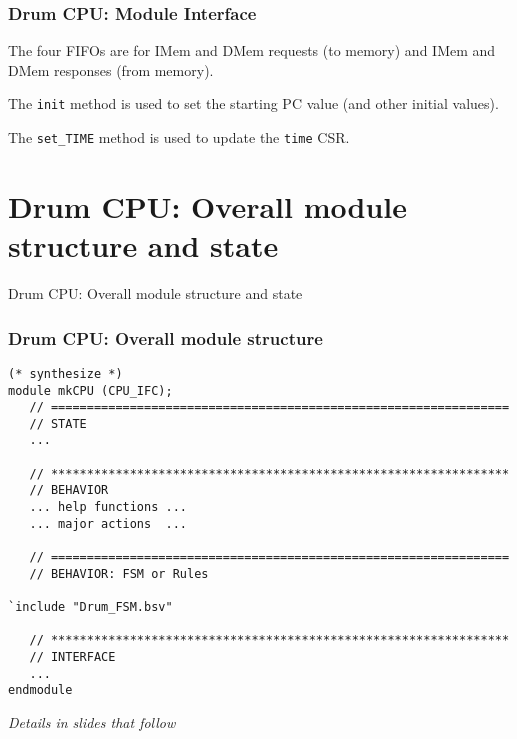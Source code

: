 
\begin{frame}[fragile]
\frametitle{Drum CPU: Module Interface}

\footnotesize


\vspace{1ex}

The four FIFOs are for IMem and DMem requests (to memory) and IMem and DMem responses (from memory).

\vspace{2ex}

The {\tt init} method is used to set the starting PC value (and other initial values).

\vspace{1ex}

The {\tt set\_TIME} method is used to update the {\tt time} CSR.

\end{frame}


\section{Drum CPU: Overall module structure and state}

\begin{frame}[fragile]

\begin{center}
  {\LARGE Drum CPU: Overall module structure and state}
\end{center}

\end{frame}


\begin{frame}[fragile]
\frametitle{Drum CPU: Overall module structure}

\footnotesize

\begin{minipage}{0.725\textwidth}
\begin{Verbatim}[frame=single, label=From src\_Drum/CPU.bsv]
(* synthesize *)
module mkCPU (CPU_IFC);
   // ================================================================
   // STATE
   ...

   // ****************************************************************
   // BEHAVIOR
   ... help functions ...
   ... major actions  ...

   // ================================================================
   // BEHAVIOR: FSM or Rules

`include "Drum_FSM.bsv"

   // ****************************************************************
   // INTERFACE
   ...
endmodule
\end{Verbatim}
\end{minipage}
\hm
\emph{Details in slides that follow}

\end{frame}

